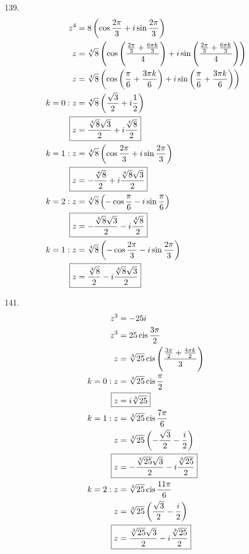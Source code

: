 \documentclass{article}
\DeclareMathOperator{\cis}{cis}
\begin{document}
\begin{itemize}
\item[139.]
	\begin{align*}
		z^4&=8\left(\cos\frac{2\pi}{3}+i\sin\frac{2\pi}{3}\right) \\
		z&=\sqrt[4]{8}\left(\cos\left(\frac{\frac{2\pi}{3}+\frac{6\pi k}{3}}{4}\right)+i\sin\left(\frac{\frac{2\pi}{3}+\frac{6\pi k}{3}}{4}\right)\right) \\
		z&=\sqrt[4]{8}\left(\cos\left(\frac{\pi}{6}+\frac{3\pi k}{6}\right)+i\sin\left(\frac{\pi}{6}+\frac{3\pi k}{6}\right)\right) \\
		k=0:z&=\sqrt[4]{8}\left(\frac{\sqrt{3}}{2}+i\frac{1}{2}\right) \\
		\Aboxed{z&=\frac{\sqrt[4]{8}\sqrt{3}}{2}+i\frac{\sqrt[4]{8}}{2}} \\
		k=1:z&=\sqrt[4]{8}\left(\cos\frac{2\pi}{3}+i\sin\frac{2\pi}{3}\right) \\
		\Aboxed{z&=-\frac{\sqrt[4]{8}}{2}+i\frac{\sqrt[4]{8}\sqrt{3}}{2}} \\
		k=2:z&=\sqrt[4]{8}\left(-\cos\frac{\pi}{6}-i\sin\frac{\pi}{6}\right) \\
		\Aboxed{z&=-\frac{\sqrt[4]{8}\sqrt{3}}{2}-i\frac{\sqrt[4]{8}}{2}} \\
		k=1:z&=\sqrt[4]{8}\left(-\cos\frac{2\pi}{3}-i\sin\frac{2\pi}{3}\right) \\
		\Aboxed{z&=\frac{\sqrt[4]{8}}{2}-i\frac{\sqrt[4]{8}\sqrt{3}}{2}} \\
	\end{align*}

\item[141.]
	\begin{align*}
		z^3&=-25i \\
		z^3&=25\cis\frac{3\pi}{2} \\
		z&=\sqrt[3]{25}\cis\left(\frac{\frac{3\pi}{2}+\frac{4\pi k}{2}}{3}\right) \\
		k=0:z&=\sqrt[3]{25}\cis\frac{\pi}{2} \\
		\Aboxed{z&=i\sqrt[3]{25}} \\
		k=1:z&=\sqrt[3]{25}\cis\frac{7\pi}{6} \\
		z&=\sqrt[3]{25}\left(-\frac{\sqrt{3}}{2}-\frac{i}{2}\right) \\
		\Aboxed{z&=-\frac{\sqrt[3]{25}\sqrt{3}}{2}-i\frac{\sqrt[3]{25}}{2}} \\
		k=2:z&=\sqrt[3]{25}\cis\frac{11\pi}{6} \\
		z&=\sqrt[3]{25}\left(\frac{\sqrt{3}}{2}-\frac{i}{2}\right) \\
		\Aboxed{z&=\frac{\sqrt[3]{25}\sqrt{3}}{2}-i\frac{\sqrt[3]{25}}{2}}
	\end{align*}


\end{itemize}
\end{document}
